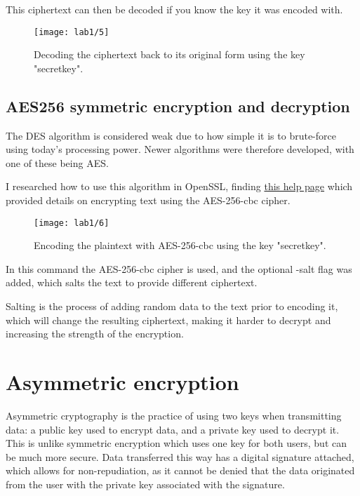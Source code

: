 This ciphertext can then be decoded if you know the key it was encoded with.

\begin{figure}[H]
    \centering
    \texttt{[image: lab1/5]}
    \caption{Decoding the ciphertext back to its original form using the key "secretkey".}
    \label{fig:DESDecrypt}
\end{figure}

\subsection{AES256 symmetric encryption and decryption}\label{subsec:aes256}
The DES algorithm is considered weak due to how simple it is to brute-force using today's processing power.
Newer algorithms were therefore developed, with one of these being AES\@.

I researched how to use this algorithm in OpenSSL, finding \href{https://www.madboa.com/geek/openssl/#how-do-i-simply-encrypt-a-file}{this help page}
\autocite{openSSLHelp} which provided details on encrypting text using the AES-256-cbc cipher.

\begin{figure}[H]
    \centering
    \texttt{[image: lab1/6]}
    \caption{Encoding the plaintext with AES-256-cbc using the key "secretkey".}
    \label{fig:AESEncrypt}
\end{figure}

In this command the AES-256-cbc cipher is used, and the optional
-salt flag was added, which salts the text to provide different ciphertext.

Salting is the process of adding random data to the text prior to encoding it, which will change
the resulting ciphertext, making it harder to decrypt and increasing the strength of the encryption.

\pagebreak

\section{Asymmetric encryption}\label{sec:asymmEncryption}
Asymmetric cryptography is the practice of using two keys when transmitting data: a public key used to encrypt
data, and a private key used to decrypt it.
This is unlike symmetric encryption which uses one key for both users, but can be much more secure.
Data transferred this way has a digital signature attached, which allows for non-repudiation, as it cannot
be denied that the data originated from the user with the private key associated with the signature.
\newline

